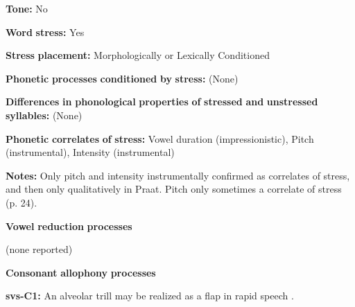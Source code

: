\begin{styleBody}
\textbf{Tone:} No
\end{styleBody}

\begin{styleBody}
\textbf{Word} \textbf{stress:} Yes
\end{styleBody}

\begin{styleBody}
\textbf{Stress} \textbf{placement:} Morphologically or Lexically Conditioned
\end{styleBody}

\begin{styleBody}
\textbf{Phonetic} \textbf{processes} \textbf{conditioned} \textbf{by} \textbf{stress:} (None)
\end{styleBody}

\begin{styleBody}
\textbf{Differences} \textbf{in} \textbf{phonological} \textbf{properties} \textbf{of} \textbf{stressed} \textbf{and} \textbf{unstressed} \textbf{syllables:} (None)
\end{styleBody}

\begin{styleBody}
\textbf{Phonetic} \textbf{correlates} \textbf{of} \textbf{stress:} Vowel duration (impressionistic), Pitch (instrumental), Intensity (instrumental)
\end{styleBody}

\begin{styleBody}
\textbf{Notes:} Only pitch and intensity instrumentally confirmed as correlates of stress, and then only qualitatively in Praat. Pitch only sometimes a correlate of stress (p. 24).
\end{styleBody}

\begin{styleBody}
\textbf{Vowel} \textbf{reduction} \textbf{processes}
\end{styleBody}

\begin{styleBody}
(none reported)
\end{styleBody}

\begin{styleBody}
\textbf{Consonant} \textbf{allophony} \textbf{processes}
\end{styleBody}

\begin{styleBody}
\textbf{svs-C1:} An alveolar trill may be realized as a flap in rapid speech \citep[17]{Wegener2010}.
\end{styleBody}

